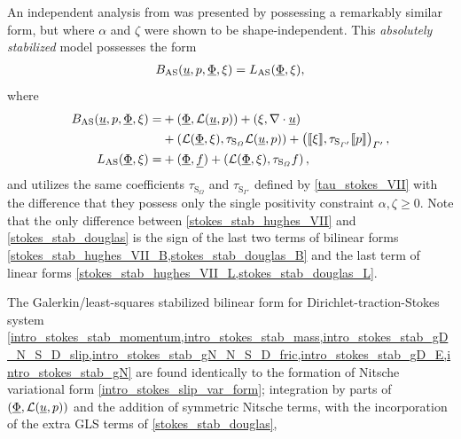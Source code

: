 An independent analysis from \citet{hughes_1987} was presented by \citet{douglas_1989} possessing a remarkably similar form, but where $\alpha$ and $\zeta$ were shown to be shape-independent.  This \emph{absolutely stabilized} model possesses the form
\begin{align}
  \label{stokes_stab_douglas}
  B_{\text{AS}}(\underline{u},p,\underline{\Phi}, \xi) = L_{\text{AS}}(\underline{\Phi}, \xi),
\end{align}
where
\begin{align}
  \label{stokes_stab_douglas_B}
  B_{\text{AS}}(\underline{u},p,\underline{\Phi}, \xi) = &+ \left( \underline{\Phi}, \mathcal{L} (\underline{u}, p) \right) + \left( \xi, \nabla \cdot \underline{u} \right) \notag \\
  &+ \left( \mathcal{L} (\underline{\Phi}, \xi), \tau_{\text{S}_{\varOmega}} \mathcal{L} (\underline{u}, p) \right) + \left( \llbracket \xi \rrbracket, \tau_{\text{S}_{\varGamma'}} \llbracket p \rrbracket \right)_{\varGamma'}, \\
  \label{stokes_stab_douglas_L}
  L_{\text{AS}}(\underline{\Phi}, \xi) = &+ ( \underline{\Phi}, \underline{f} ) + \left( \mathcal{L} (\underline{\Phi}, \xi), \tau_{\text{S}_{\varOmega}} f \right),
\end{align}
and utilizes the same coefficients $\tau_{\text{S}_{\Omega}}$ and $\tau_{\text{S}_{\Gamma'}}$ defined by \cref{tau_stokes_VII} with the difference that they possess only the single positivity constraint $\alpha, \zeta \geq 0$.
Note that the only difference between \cref{stokes_stab_hughes_VII} and \cref{stokes_stab_douglas} is the sign of the last two terms of bilinear forms \cref{stokes_stab_hughes_VII_B,stokes_stab_douglas_B} and the last term of linear forms \cref{stokes_stab_hughes_VII_L,stokes_stab_douglas_L}.
  
The Galerkin/least-squares stabilized bilinear form for Dirichlet-traction-Stokes system \cref{intro_stokes_stab_momentum,intro_stokes_stab_mass,intro_stokes_stab_gD_N_S_D_slip,intro_stokes_stab_gN_N_S_D_fric,intro_stokes_stab_gD_E,intro_stokes_stab_gN} are found identically to the formation of Nitsche variational form \cref{intro_stokes_slip_var_form}; integration by parts of $(\underline{\Phi}, \mathcal{L} (\underline{u},p))$ and the addition of symmetric Nitsche terms, with the incorporation of the extra GLS terms of \cref{stokes_stab_douglas},

